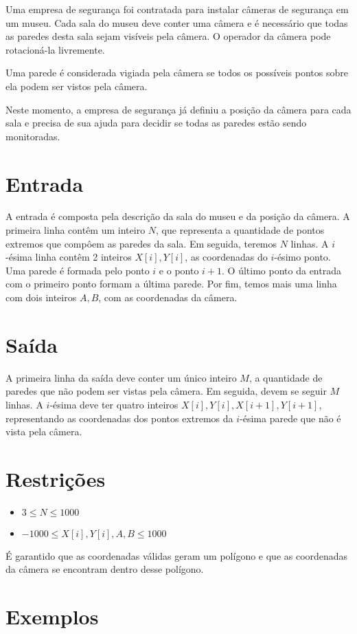 Uma empresa de segurança foi contratada para instalar câmeras de segurança em um museu. Cada sala do museu deve conter uma câmera e é necessário que todas as paredes desta sala sejam visíveis pela câmera. O operador da câmera pode rotacioná-la livremente.

Uma parede é considerada vigiada pela câmera se todos os possíveis pontos sobre ela podem ser vistos pela câmera.

Neste momento, a empresa de segurança já definiu a posição da câmera para cada sala e precisa de sua ajuda para decidir se todas as paredes estão sendo monitoradas.


\section*{Entrada}

A entrada é composta pela descrição da sala do museu e da posição da câmera.
A primeira linha contêm um inteiro $N$, que representa a quantidade de pontos extremos que compôem as paredes da sala.
Em seguida, teremos $N$ linhas. A $i$-ésima linha contêm 2 inteiros $X[i], Y[i]$, as coordenadas do $i$-ésimo ponto.
Uma parede é formada pelo ponto $i$ e o ponto $i+1$. O último ponto da entrada com o primeiro ponto formam a última parede.
Por fim, temos mais uma linha com dois inteiros $A, B$, com as coordenadas da câmera.

\section*{Saída}

A primeira linha da saída deve conter um único inteiro $M$, a quantidade de paredes que não podem ser vistas pela câmera. Em seguida, devem se seguir $M$ linhas. A $i$-ésima deve ter quatro inteiros $X[i], Y[i], X[i+1], Y[i+1]$, representando as coordenadas dos pontos extremos da $i$-ésima parede que não é vista pela câmera.

\section*{Restrições}

\begin{itemize}
\item $3 \leq N \leq 1000$
\item $-1000 \leq X[i], Y[i], A, B\leq 1000$
\end{itemize}

É garantido que as coordenadas válidas geram um polígono e que as coordenadas da câmera se encontram dentro desse polígono.


\section*{Exemplos}

\exemplo
